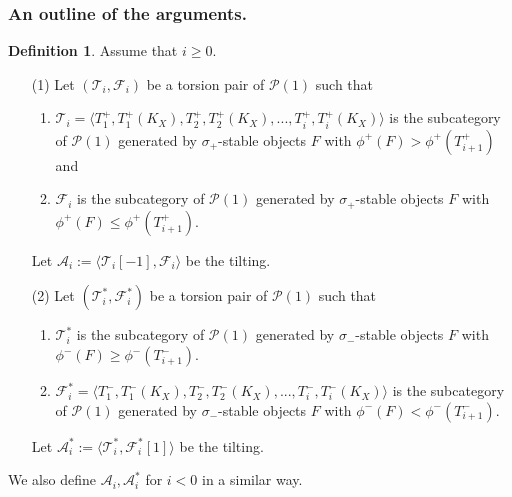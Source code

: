 \documentclass[leqno,11pt]{amsart}
\theoremstyle{definition}
\newtheorem{Def}[Thm]{Definition}
\def\AA{\ensuremath{\mathcal A}}
\def\FF{\ensuremath{\mathcal F}}
\def\PP{\ensuremath{\mathcal P}}
\def\TT{\ensuremath{\mathcal T}}
\begin{document}
\subsubsection{An outline of the arguments.}

\begin{Def}
Assume that $i  \geq 0$.
\begin{enumerate}
\item[(1)]
Let $(\TT_i,\FF_i)$ be a torsion pair of $\PP(1)$ such that
\begin{enumerate}
\item
$\TT_i=\langle T_1^+,T_1^+(K_X),T_2^+,T_2^+ (K_X),...,T_i^+,
T_i^+ (K_X) \rangle$ 
is the subcategory of $\PP(1)$ generated by $\sigma_+$-stable objects
$F$ with $\phi^+(F)>\phi^+(T_{i+1}^+)$ and
\item
$\FF_i$ is the subcategory of $\PP(1)$ generated by 
$\sigma_+$-stable objects $F$
with $\phi^+(F) \leq \phi^+(T_{i+1}^+)$.
\end{enumerate}
Let $\AA_i:=\langle \TT_i[-1],\FF_i \rangle$ be the tilting.
\item[(2)]
Let $(\TT_i^*,\FF_i^*)$ be a torsion pair of $\PP(1)$ such that
\begin{enumerate}
\item
$\TT_i^*$ is the subcategory of $\PP(1)$ generated by 
$\sigma_-$-stable objects $F$
with $\phi^-(F) \geq \phi^-(T_{i+1}^-)$.
\item
$\FF_i^*=\langle T_1^-,T_1^-(K_X),T_2^-,T_2^-(K_X),...,
T_i^-,T_i^-(K_X) \rangle$ 
is the subcategory of $\PP(1)$ generated by $\sigma_-$-stable objects
$F$ with $\phi^-(F)<\phi^-(T_{i+1}^-)$.
\end{enumerate}
Let $\AA_i^*:=\langle \TT_i^*,\FF_i^*[1] \rangle$ be the tilting.
\end{enumerate}
\end{Def}
We also define $\AA_i, \AA_i^*$ for $i <0$ in a similar way.


\end{document}
